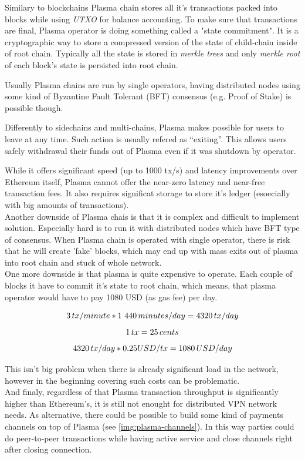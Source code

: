 \documentclass[a4paper,12pt]{article}
\begin{document}
Similary to blockchains Plasma chain stores all it's transactions packed into 
blocks while using \textit{UTXO} for balance accounting. To make sure that 
transactions are final, Plasma operator is doing something called a "state 
commitment". It is a cryptographic way to store a compressed version of the 
state of child-chain inside of root chain. Typically all the state is stored in
\textit{merkle trees} and only \textit{merkle root} of each block's state is 
persisted into root chain.

Usually Plasma chains are run by single operators, having distributed nodes 
using some kind of Byzantine Fault Tolerant (BFT) consensus (e.g. Proof of 
Stake) is possible though.

Differently to sidechains and multi-chains, Plasma makes possible for users to 
leave at any time. Such action is usually refered as “exiting”. This allows users 
safely withdrawal their funds out of Plasma even if it was shutdown by operator.

While it offers significant speed (up to 1000 tx/s) and latency improvements 
over Ethereum itself, Plasma cannot offer the near-zero latency and near-free 
transaction fees. It also requires significat storage to store it's ledger
(esoecially with big amounts of transactions).\\

Another downside of Plasma chais is that it is complex and difficult to 
implement solution. Especially hard is to run it with distributed nodes which 
have BFT type of consensus. When Plasma chain is operated with single operator, 
there is risk that he will create 'fake' blocks, which may end up with mass 
exits out of plasma into root chain and stuck of whole network.\\

One more downside is that plasma is quite expensive to operate. Each couple of 
blocks it have to commit it's state to root chain, which means, that plasma 
operator would have to pay 1080 USD (as gas fee) per day. 

\[ 3 \thinspace tx / minute * 1 440 \thinspace minutes / day = 4320 \thinspace tx/day \]
\[ 1 \thinspace tx = 25 \thinspace cents \]
\[ 4320 \thinspace tx/day * 0.25 USD/tx = 1080 \thinspace USD/day \]

This isn't big problem when there is already significant load in the network, 
however in the beginning covering such costs can be problematic.\\

And finaly, regardless of that Plasma transaction throughput is significantly 
higher than Ethereum's, it is still not enought for distributed VPN network 
needs. As alternative, there could be possible to build some kind of payments 
channels on top of Plasma (see \ref{img:plasma-channels}). In this way parties 
could do peer-to-peer transactions while having active service and close 
channels right after closing connection. 
\end{document}
